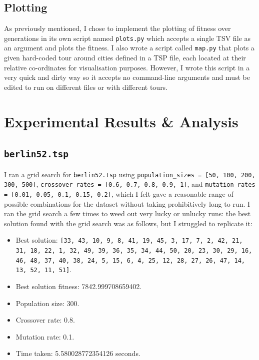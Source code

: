 \documentclass[a4paper]{article}
\begin{document}
\subsection{Plotting}
As previously mentioned, I chose to implement the plotting of fitness over generations in its own script named \verb|plots.py| which accepts a single TSV file as an argument and plots the fitness.
I also wrote a script called \verb|map.py| that plots a given hard-coded tour around cities defined in a TSP file, each located at their relative co-ordinates for visualisation purposes.
However, I wrote this script in a very quick and dirty way so it accepts no command-line arguments and must be edited to run on different files or with different tours.

\section{Experimental Results \& Analysis}
\subsection{\texttt{berlin52.tsp}}
I ran a grid search for \verb|berlin52.tsp| using \texttt{population\_sizes = [50, 100, 200, 300, 500]}, \texttt{crossover\_rates = [0.6, 0.7, 0.8, 0.9, 1]}, and \texttt{mutation\_rates = [0.01, 0.05, 0.1, 0.15, 0.2]}, which I felt gave a reasonable range of possible combinations for the dataset without taking prohibitively long to run.
I ran the grid search a few times to weed out very lucky or unlucky runs:
the best solution found with the grid search was as follows, but I struggled to replicate it:
\begin{itemize}
    \item   Best solution: \texttt{[33, 43, 10, 9, 8, 41, 19, 45, 3, 17, 7, 2, 42, 21, 31, 18, 22, 1, 32, 49, 39, 36, 35, 34, 44, 50, 20, 23, 30, 29, 16, 46, 48, 37, 40, 38, 24, 5, 15, 6, 4, 25, 12, 28, 27, 26, 47, 14, 13, 52, 11, 51]}.
    \item   Best solution fitness: 7842.999708659402.
    \item   Population size: 300.
    \item   Crossover rate: 0.8.
    \item   Mutation rate: 0.1.
    \item Time taken: 5.580028772354126 seconds.
\end{itemize}
\end{document}
